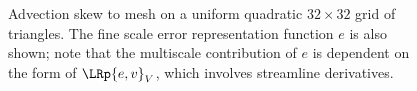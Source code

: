 \begin{figure}[!h]
\caption{Advection skew to mesh on a uniform quadratic $32\times 32$ grid of triangles.  The fine scale error representation function $e$ is also shown; note that the multiscale contribution of $e$ is dependent on the form of $\LRp{e,v}_V$, which involves streamline derivatives.}
\end{figure}

